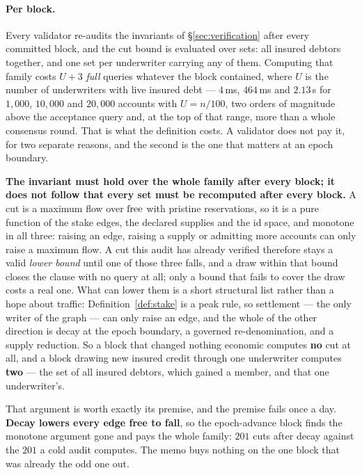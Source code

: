 \paragraph{Per block.} Every validator re-audits the invariants of
\S\ref{sec:verification} after every committed block, and the cut bound is evaluated over
sets: all insured debtors together, and one set per underwriter carrying any of them.
Computing that family costs $U + 3$ \emph{full} queries whatever the block contained,
where $U$ is the number of underwriters with live insured debt --- $4$\,ms, $464$\,ms and
$2.13$\,s for $1{,}000$, $10{,}000$ and $20{,}000$ accounts with $U = n/100$, two orders
of magnitude above the acceptance query and, at the top of that range, more than a whole
consensus round. That is what the definition costs. A validator does not pay it, for two
separate reasons, and the second is the one that matters at an epoch boundary.

\textbf{The invariant must hold over the whole family after every block; it does not
follow that every set must be recomputed after every block.} A cut is a maximum flow over
$\mathrm{free}$ with pristine reservations, so it is a pure function of the stake edges, the
declared supplies and the id space, and monotone in all three: raising an edge, raising a
supply or admitting more accounts can only raise a maximum flow. A cut this audit has
already verified therefore stays a valid \emph{lower bound} until one of those three
falls, and a draw within that bound closes the clause with no query at all; only a bound
that fails to cover the draw costs a real one. What can lower them is a short structural
list rather than a hope about traffic: Definition~\ref{def:stake} is a peak rule, so
settlement --- the only writer of the graph --- can only raise an edge, and the whole of
the other direction is decay at the epoch boundary, a governed re-denomination, and a
supply reduction. So a block that changed nothing economic computes \textbf{no} cut at
all, and a block drawing new insured credit through one underwriter computes \textbf{two}
--- the set of all insured debtors, which gained a member, and that one underwriter's.

That argument is worth exactly its premise, and the premise fails once a day.
\textbf{Decay lowers every edge free to fall}, so the epoch-advance block finds the
monotone argument gone and pays the whole family: $201$ cuts after decay against the
$201$ a cold audit computes. The memo buys nothing on the one block that was already the
odd one out.

